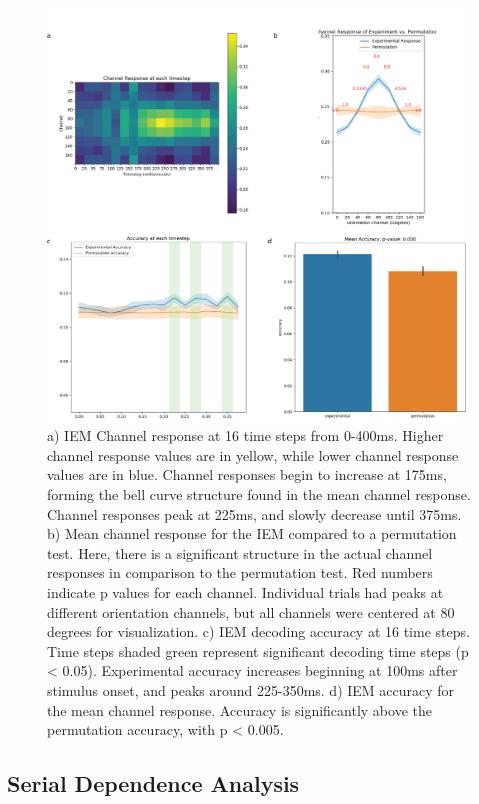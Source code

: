 \documentclass[../main.tex]{subfiles}
\begin{document}
\begin{figure}
    \centering
    \includegraphics[scale=0.7]{figures/results/iem_results.png}
    \caption{a) IEM Channel response at 16 time steps from 0-400ms. Higher channel response values are in yellow, while lower channel response values are in blue. Channel responses begin to increase at 175ms, forming the bell curve structure found in the mean channel response. Channel responses peak at 225ms, and slowly decrease until 375ms. b) Mean channel response for the IEM compared to a permutation test. Here, there is a significant structure in the actual channel responses in comparison to the permutation test. Red numbers indicate p values for each channel. Individual trials had peaks at different orientation channels, but all channels were centered at 80 degrees for visualization. c) IEM decoding accuracy at 16 time steps. Time steps shaded green represent significant decoding time steps (p < 0.05). Experimental accuracy increases beginning at 100ms after stimulus onset, and peaks around 225-350ms. d) IEM accuracy for the mean channel response. Accuracy is significantly above the permutation accuracy, with p < 0.005.}
    \label{iem_results}
\end{figure}

\subsection{Serial Dependence Analysis}
\end{document}
